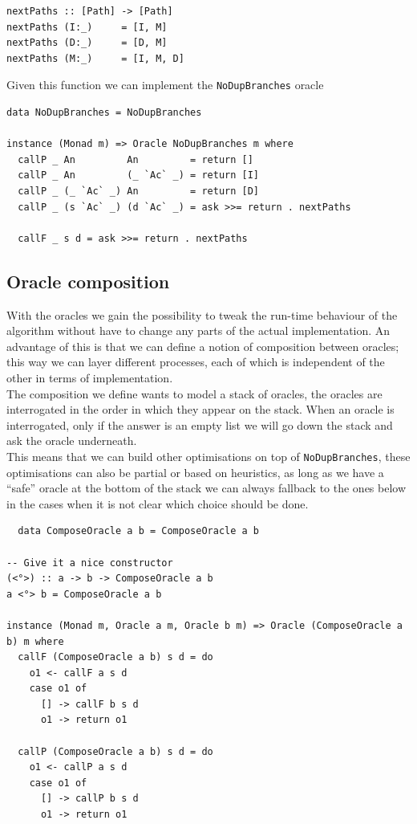 \documentclass[11pt, titlepage]{article}
\begin{document}
\begin{verbatim}
nextPaths :: [Path] -> [Path]
nextPaths (I:_)     = [I, M]
nextPaths (D:_)     = [D, M]
nextPaths (M:_)     = [I, M, D]
\end{verbatim}

Given this function we can implement the \texttt{NoDupBranches} oracle

\begin{verbatim}
data NoDupBranches = NoDupBranches

instance (Monad m) => Oracle NoDupBranches m where
  callP _ An         An         = return []
  callP _ An         (_ `Ac` _) = return [I]
  callP _ (_ `Ac` _) An         = return [D]
  callP _ (s `Ac` _) (d `Ac` _) = ask >>= return . nextPaths

  callF _ s d = ask >>= return . nextPaths
\end{verbatim}

\subsection{Oracle composition}

With the oracles we gain the possibility to tweak the run-time behaviour of the 
algorithm without have to change any parts of the actual implementation.
An advantage of this is that we can define a notion of 
composition between oracles; this way we can layer different processes, each of 
which is independent of the other in terms of implementation.
\\
The composition we define wants to model a stack of oracles, the oracles are 
interrogated in the order in which they appear on the stack. When an oracle is 
interrogated, only if the answer is an empty list we will go down the stack and 
ask the oracle underneath. 
\\
This means that we can build other optimisations on top of \texttt{NoDupBranches}, these optimisations can also be partial or based on heuristics, as long as we have a ``safe'' oracle at the bottom of the stack we can always fallback to the ones below in the cases when it is not clear which choice should be done.

\begin{verbatim}
  data ComposeOracle a b = ComposeOracle a b

-- Give it a nice constructor
(<°>) :: a -> b -> ComposeOracle a b
a <°> b = ComposeOracle a b

instance (Monad m, Oracle a m, Oracle b m) => Oracle (ComposeOracle a b) m where
  callF (ComposeOracle a b) s d = do
    o1 <- callF a s d
    case o1 of
      [] -> callF b s d
      o1 -> return o1

  callP (ComposeOracle a b) s d = do
    o1 <- callP a s d
    case o1 of
      [] -> callP b s d
      o1 -> return o1
\end{verbatim}
\end{document}

